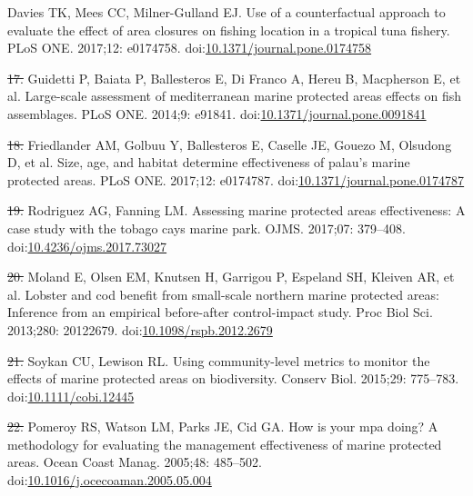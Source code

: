 \documentclass[12pt,]{article}
\providecommand{\DIFaddtex}[1]{{\protect\color{blue}\uwave{#1}}} %
\providecommand{\DIFdeltex}[1]{{\protect\color{red}\sout{#1}}}                      %
\providecommand{\DIFaddbegin}{} %
\providecommand{\DIFaddend}{} %
\providecommand{\DIFdelbegin}{} %
\providecommand{\DIFdelend}{} %
\providecommand{\DIFadd}[1]{\texorpdfstring{\DIFaddtex{#1}}{#1}} %
\providecommand{\DIFdel}[1]{\texorpdfstring{\DIFdeltex{#1}}{}} %
\newcommand{\DIFscaledelfig}{0.5}
\newlength{\DIFdelgraphicswidth} %
\newlength{\DIFdelgraphicsheight} %
\newcommand{\DIFaddincludegraphics}[2][]{{\color{blue}\fbox{\DIFOincludegraphics[#1]{#2}}}} %
\newcommand{\DIFdelincludegraphics}[2][]{%
\sbox{\DIFdelgraphicsbox}{\DIFOincludegraphics[#1]{#2}}%
\settoboxwidth{\DIFdelgraphicswidth}{\DIFdelgraphicsbox} %
\settoboxtotalheight{\DIFdelgraphicsheight}{\DIFdelgraphicsbox} %
\scalebox{\DIFscaledelfig}{%
\parbox[b]{\DIFdelgraphicswidth}{\usebox{\DIFdelgraphicsbox}\\[-\baselineskip] \rule{\DIFdelgraphicswidth}{0em}}\llap{\resizebox{\DIFdelgraphicswidth}{\DIFdelgraphicsheight}{%
\setlength{\unitlength}{\DIFdelgraphicswidth}%
\begin{picture}(1,1)%
\thicklines\linethickness{2pt} %
{\color[rgb]{1,0,0}\put(0,0){\framebox(1,1){}}}%
{\color[rgb]{1,0,0}\put(0,0){\line( 1,1){1}}}%
{\color[rgb]{1,0,0}\put(0,1){\line(1,-1){1}}}%
\end{picture}%
}\hspace*{3pt}}} %
} %
\DeclareRobustCommand{\DIFaddbegin}{\DIFOaddbegin \let\includegraphics\DIFaddincludegraphics} %
\DeclareRobustCommand{\DIFaddend}{\DIFOaddend \let\includegraphics\DIFOincludegraphics} %
\DeclareRobustCommand{\DIFdelbegin}{\DIFOdelbegin \let\includegraphics\DIFdelincludegraphics} %
\DeclareRobustCommand{\DIFdelend}{\DIFOaddend \let\includegraphics\DIFOincludegraphics} %
\begin{document}
\hypertarget{ref-davies_2017-ml}{}
\DIFadd{17. }\DIFaddend Davies TK, Mees CC, Milner-Gulland EJ. Use of a counterfactual
approach to evaluate the effect of area closures on fishing location in
a tropical tuna fishery. PLoS ONE. 2017;12: e0174758.
doi:\href{https://doi.org/10.1371/journal.pone.0174758}{10.1371/journal.pone.0174758}

\hypertarget{ref-guidetti_2014-8Z}{}
\DIFdelbegin \DIFdel{17. }\DIFdelend \DIFaddbegin \DIFadd{18. }\DIFaddend Guidetti P, Baiata P, Ballesteros E, Di Franco A, Hereu B,
Macpherson E, et al. Large-scale assessment of mediterranean marine
protected areas effects on fish assemblages. PLoS ONE. 2014;9: e91841.
doi:\href{https://doi.org/10.1371/journal.pone.0091841}{10.1371/journal.pone.0091841}

\hypertarget{ref-friedlander_2017-oI}{}
\DIFdelbegin \DIFdel{18. }\DIFdelend \DIFaddbegin \DIFadd{19. }\DIFaddend Friedlander AM, Golbuu Y, Ballesteros E, Caselle JE, Gouezo M,
Olsudong D, et al. Size, age, and habitat determine effectiveness of
palau's marine protected areas. PLoS ONE. 2017;12: e0174787.
doi:\href{https://doi.org/10.1371/journal.pone.0174787}{10.1371/journal.pone.0174787}

\hypertarget{ref-rodriguez_2017-PD}{}
\DIFdelbegin \DIFdel{19. }\DIFdelend \DIFaddbegin \DIFadd{20. }\DIFaddend Rodriguez AG, Fanning LM. Assessing marine protected areas
effectiveness: A case study with the tobago cays marine park. OJMS.
2017;07: 379--408.
doi:\href{https://doi.org/10.4236/ojms.2017.73027}{10.4236/ojms.2017.73027}

\hypertarget{ref-moland_2013-VP}{}
\DIFdelbegin \DIFdel{20. }\DIFdelend \DIFaddbegin \DIFadd{21. }\DIFaddend Moland E, Olsen EM, Knutsen H, Garrigou P, Espeland SH, Kleiven AR,
et al. Lobster and cod benefit from small-scale northern marine
protected areas: Inference from an empirical before-after control-impact
study. Proc Biol Sci. 2013;280: 20122679.
doi:\href{https://doi.org/10.1098/rspb.2012.2679}{10.1098/rspb.2012.2679}

\hypertarget{ref-soykan_2015-nu}{}
\DIFdelbegin \DIFdel{21. }\DIFdelend \DIFaddbegin \DIFadd{22. }\DIFaddend Soykan CU, Lewison RL. Using community-level metrics to monitor the
effects of marine protected areas on biodiversity. Conserv Biol.
2015;29: 775--783.
doi:\href{https://doi.org/10.1111/cobi.12445}{10.1111/cobi.12445}

\hypertarget{ref-pomeroy_2005-Py}{}
\DIFdelbegin \DIFdel{22. }\DIFdelend \DIFaddbegin \DIFadd{23. }\DIFaddend Pomeroy RS, Watson LM, Parks JE, Cid GA. How is your mpa doing? A
methodology for evaluating the management effectiveness of marine
protected areas. Ocean Coast Manag. 2005;48: 485--502.
doi:\href{https://doi.org/10.1016/j.ocecoaman.2005.05.004}{10.1016/j.ocecoaman.2005.05.004}
\end{document}
